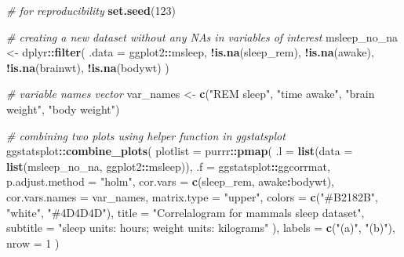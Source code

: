 \documentclass[
]{article}
\newenvironment{Shaded}{\begin{snugshade}}{\end{snugshade}}
\newcommand{\CommentTok}[1]{\textcolor[rgb]{0.56,0.35,0.01}{\textit{#1}}}
\newcommand{\DataTypeTok}[1]{\textcolor[rgb]{0.13,0.29,0.53}{#1}}
\newcommand{\DecValTok}[1]{\textcolor[rgb]{0.00,0.00,0.81}{#1}}
\newcommand{\KeywordTok}[1]{\textcolor[rgb]{0.13,0.29,0.53}{\textbf{#1}}}
\newcommand{\NormalTok}[1]{#1}
\newcommand{\OperatorTok}[1]{\textcolor[rgb]{0.81,0.36,0.00}{\textbf{#1}}}
\newcommand{\StringTok}[1]{\textcolor[rgb]{0.31,0.60,0.02}{#1}}
\begin{document}
\begin{Shaded}
\begin{Highlighting}[]
\CommentTok{\# for reproducibility}
\KeywordTok{set.seed}\NormalTok{(}\DecValTok{123}\NormalTok{)}

\CommentTok{\# creating a new dataset without any NAs in variables of interest}
\NormalTok{msleep\_no\_na <{-}}
\StringTok{  }\NormalTok{dplyr}\OperatorTok{::}\KeywordTok{filter}\NormalTok{(}
    \DataTypeTok{.data =}\NormalTok{ ggplot2}\OperatorTok{::}\NormalTok{msleep,}
    \OperatorTok{!}\KeywordTok{is.na}\NormalTok{(sleep\_rem), }\OperatorTok{!}\KeywordTok{is.na}\NormalTok{(awake), }\OperatorTok{!}\KeywordTok{is.na}\NormalTok{(brainwt), }\OperatorTok{!}\KeywordTok{is.na}\NormalTok{(bodywt)}
\NormalTok{  )}

\CommentTok{\# variable names vector}
\NormalTok{var\_names <{-}}\StringTok{ }\KeywordTok{c}\NormalTok{(}\StringTok{"REM sleep"}\NormalTok{, }\StringTok{"time awake"}\NormalTok{, }\StringTok{"brain weight"}\NormalTok{, }\StringTok{"body weight"}\NormalTok{)}

\CommentTok{\# combining two plots using helper function in \textasciigrave{}ggstatsplot\textasciigrave{}}
\NormalTok{ggstatsplot}\OperatorTok{::}\KeywordTok{combine\_plots}\NormalTok{(}
  \DataTypeTok{plotlist =}\NormalTok{ purrr}\OperatorTok{::}\KeywordTok{pmap}\NormalTok{(}
    \DataTypeTok{.l =} \KeywordTok{list}\NormalTok{(}\DataTypeTok{data =} \KeywordTok{list}\NormalTok{(msleep\_no\_na, ggplot2}\OperatorTok{::}\NormalTok{msleep)),}
    \DataTypeTok{.f =}\NormalTok{ ggstatsplot}\OperatorTok{::}\NormalTok{ggcorrmat,}
    \DataTypeTok{p.adjust.method =} \StringTok{"holm"}\NormalTok{,}
    \DataTypeTok{cor.vars =} \KeywordTok{c}\NormalTok{(sleep\_rem, awake}\OperatorTok{:}\NormalTok{bodywt),}
    \DataTypeTok{cor.vars.names =}\NormalTok{ var\_names,}
    \DataTypeTok{matrix.type =} \StringTok{"upper"}\NormalTok{,}
    \DataTypeTok{colors =} \KeywordTok{c}\NormalTok{(}\StringTok{"\#B2182B"}\NormalTok{, }\StringTok{"white"}\NormalTok{, }\StringTok{"\#4D4D4D"}\NormalTok{),}
    \DataTypeTok{title =} \StringTok{"Correlalogram for mammals sleep dataset"}\NormalTok{,}
    \DataTypeTok{subtitle =} \StringTok{"sleep units: hours; weight units: kilograms"}
\NormalTok{  ),}
  \DataTypeTok{labels =} \KeywordTok{c}\NormalTok{(}\StringTok{"(a)"}\NormalTok{, }\StringTok{"(b)"}\NormalTok{),}
  \DataTypeTok{nrow =} \DecValTok{1}
\NormalTok{)}
\end{Highlighting}
\end{Shaded}
\end{document}
